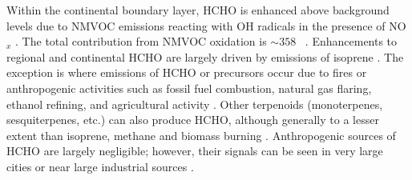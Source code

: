     Within the continental boundary layer, HCHO is enhanced above background levels due to NMVOC emissions reacting with OH radicals in the presence of NO$_x$ \parencite{Wagner2002, Millet2006, Kefauver2014}.
    The total contribution from NMVOC oxidation is $\sim 358$\tgpyr 
    ~\parencite{FortemsCheiney2012}.
    Enhancements to regional and continental HCHO are largely driven by emissions of isoprene \parencite{Guenther1995, Palmer2003, Shim2005, Kefauver2014}.
    The exception is where emissions of HCHO or precursors occur due to fires or anthropogenic activities such as fossil fuel combustion, natural gas flaring, ethanol refining, and agricultural activity \parencite{Guenther1995, Kefauver2014, Wolfe2016}.
    Other terpenoids (monoterpenes, sesquiterpenes, etc.) can also produce HCHO, although generally to a lesser extent than isoprene, methane and biomass burning \parencite{Guenther2012}.
    Anthropogenic sources of HCHO are largely negligible; however, their signals can be seen in very large cities or near large industrial sources \parencite{Millet2008,Zhu2014}.
    
